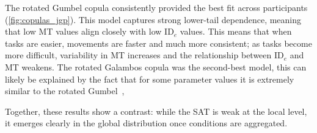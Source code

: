 \documentclass[acmlarge, manuscript,review]{acmart}
\newcommand{\mt}{\ensuremath{{\text{MT}}}\xspace}
\newcommand{\ide}{\ensuremath{{\text{ID}_e}}\xspace}
\newcommand{\D}{\ensuremath{{\text{D}}}\xspace}
\newcommand{\W}{\ensuremath{{\text{W}}}\xspace}
\begin{document}
The rotated Gumbel copula consistently provided the best fit across participants (\autoref{fig:copulas_jgp}). This model captures strong lower-tail dependence, meaning that low MT values align closely with low \ide values. This means that when tasks are easier, movements are faster and much more consistent; as tasks become more difficult, variability in MT increases and the relationship between \ide and MT weakens. The rotated Galambos copula was the second-best model, this can likely be explained by the fact that for some parameter values it is extremely similar to the rotated Gumbel~\cite{genest2017},

Together, these results show a contrast: while the SAT is weak at the local level, it emerges clearly in the global distribution once conditions are aggregated.









\end{document}
